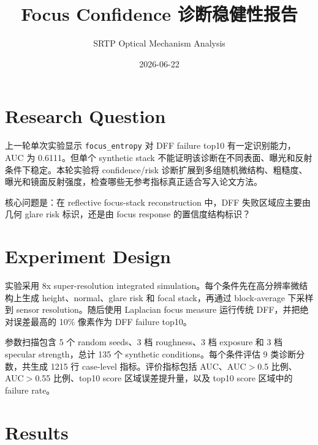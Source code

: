 \documentclass[11pt]{article}
\title{Focus Confidence 诊断稳健性报告}
\author{SRTP Optical Mechanism Analysis}
\date{2026-06-22}
\begin{document}
\maketitle

\section{Research Question}

上一轮单次实验显示 \texttt{focus\_entropy} 对 DFF failure top10 有一定识别能力，AUC 为 0.6111。但单个 synthetic stack 不能证明该诊断在不同表面、曝光和反射条件下稳定。本轮实验将 confidence/risk 诊断扩展到多组随机微结构、粗糙度、曝光和镜面反射强度，检查哪些无参考指标真正适合写入论文方法。

核心问题是：在 reflective focus-stack reconstruction 中，DFF 失败区域应主要由几何 glare risk 标识，还是由 focus response 的置信度结构标识？

\section{Experiment Design}

实验采用 8x super-resolution integrated simulation。每个条件先在高分辨率微结构上生成 height、normal、glare risk 和 focal stack，再通过 block-average 下采样到 sensor resolution。随后使用 Laplacian focus measure 运行传统 DFF，并把绝对误差最高的 10\% 像素作为 DFF failure top10。

参数扫描包含 5 个 random seeds、3 档 roughness、3 档 exposure 和 3 档 specular strength，总计 135 个 synthetic conditions。每个条件评估 9 类诊断分数，共生成 1215 行 case-level 指标。评价指标包括 AUC、AUC$>$0.5 比例、AUC$>$0.55 比例、top10 score 区域误差提升量，以及 top10 score 区域中的 failure rate。

\section{Results}
\end{document}
